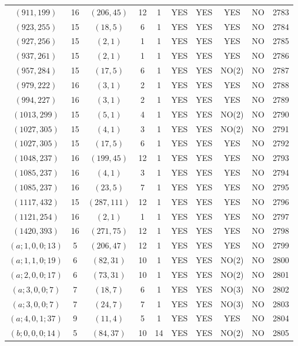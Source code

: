 \begin{longtable}{|c|c|c|c|c|c|c|c|c|c|}
$(911, 199)$ & 16 & $(206, 45)$ & 12 & 1 & YES & YES & YES & NO & 2783\\
$(923, 255)$ & 15 & $(18, 5)$ & 6 & 1 & YES & YES & YES & NO & 2784\\
$(927, 256)$ & 15 & $(2, 1)$ & 1 & 1 & YES & YES & YES & NO & 2785\\
$(937, 261)$ & 15 & $(2, 1)$ & 1 & 1 & YES & YES & YES & NO & 2786\\
$(957, 284)$ & 15 & $(17, 5)$ & 6 & 1 & YES & YES & NO(2) & NO & 2787\\
$(979, 222)$ & 16 & $(3, 1)$ & 2 & 1 & YES & YES & YES & NO & 2788\\
$(994, 227)$ & 16 & $(3, 1)$ & 2 & 1 & YES & YES & YES & NO & 2789\\
$(1013, 299)$ & 15 & $(5, 1)$ & 4 & 1 & YES & YES & NO(2) & NO & 2790\\
$(1027, 305)$ & 15 & $(4, 1)$ & 3 & 1 & YES & YES & NO(2) & NO & 2791\\
$(1027, 305)$ & 15 & $(17, 5)$ & 6 & 1 & YES & YES & YES & NO & 2792\\
$(1048, 237)$ & 16 & $(199, 45)$ & 12 & 1 & YES & YES & YES & NO & 2793\\
$(1085, 237)$ & 16 & $(4, 1)$ & 3 & 1 & YES & YES & YES & NO & 2794\\
$(1085, 237)$ & 16 & $(23, 5)$ & 7 & 1 & YES & YES & YES & NO & 2795\\
$(1117, 432)$ & 15 & $(287, 111)$ & 12 & 1 & YES & YES & YES & NO & 2796\\
$(1121, 254)$ & 16 & $(2, 1)$ & 1 & 1 & YES & YES & YES & NO & 2797\\
$(1420, 393)$ & 16 & $(271, 75)$ & 12 & 1 & YES & YES & YES & NO & 2798\\
$(a; 1, 0, 0; 13)$ & 5 & $(206, 47)$ & 12 & 1 & YES & YES & YES & NO & 2799\\
$(a; 1, 1, 0; 19)$ & 6 & $(82, 31)$ & 10 & 1 & YES & YES & NO(2) & NO & 2800\\
$(a; 2, 0, 0; 17)$ & 6 & $(73, 31)$ & 10 & 1 & YES & YES & NO(2) & NO & 2801\\
$(a; 3, 0, 0; 7)$ & 7 & $(18, 7)$ & 6 & 1 & YES & YES & NO(3) & NO & 2802\\
$(a; 3, 0, 0; 7)$ & 7 & $(24, 7)$ & 7 & 1 & YES & YES & NO(3) & NO & 2803\\
$(a; 4, 0, 1; 37)$ & 9 & $(11, 4)$ & 5 & 1 & YES & YES & YES & NO & 2804\\
$(b; 0, 0, 0; 14)$ & 5 & $(84, 37)$ & 10 & 14 & YES & YES & NO(2) & NO & 2805\\

\end{longtable}
